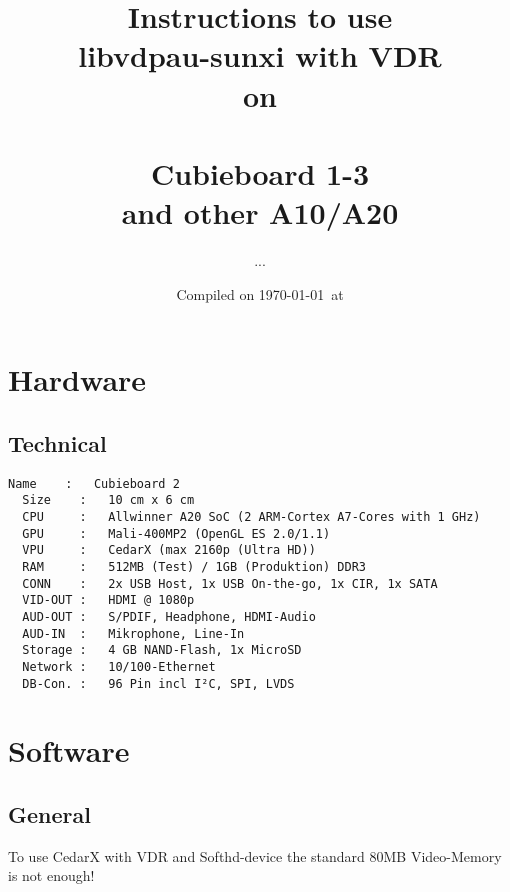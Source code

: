 \documentclass[11pt, a4paper,ngerman]{article}
\title{ Instructions to use \\ libvdpau-sunxi with VDR \\ on \\ \cubiebig \\ Cubieboard 1-3 \\ and other A10/A20}
\author{ ... }
\date{Compiled on \today\ at \currenttime}
\begin{document}
\maketitle
\newpage %
\tableofcontents 
\newpage %


\section{Hardware}
\subsection{Technical}
\begin{Verbatim}[frame=lines,
       framerule=0.2mm,framesep=3mm,
       rulecolor=\color{monoorange},
       fillcolor=\color{monogreen},
       label=\cubiebig,labelposition=topline]
  Name    :   Cubieboard 2
  Size    :   10 cm x 6 cm
  CPU     :   Allwinner A20 SoC (2 ARM-Cortex A7-Cores with 1 GHz)
  GPU     :   Mali-400MP2 (OpenGL ES 2.0/1.1)
  VPU     :   CedarX (max 2160p (Ultra HD))
  RAM     :   512MB (Test) / 1GB (Produktion) DDR3
  CONN    :   2x USB Host, 1x USB On-the-go, 1x CIR, 1x SATA
  VID-OUT :   HDMI @ 1080p
  AUD-OUT :   S/PDIF, Headphone, HDMI-Audio
  AUD-IN  :   Mikrophone, Line-In
  Storage :   4 GB NAND-Flash, 1x MicroSD
  Network :   10/100-Ethernet
  DB-Con. :   96 Pin incl I²C, SPI, LVDS
\end{Verbatim}

\section{Software}
\subsection{General}

To use CedarX with VDR and Softhd-device the standard 80MB Video-Memory is not enough!\\
\end{document}
